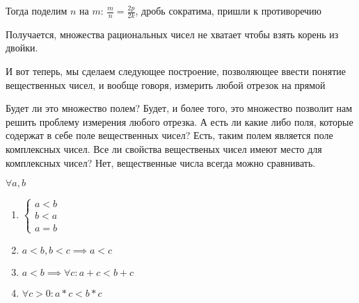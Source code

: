 Тогда поделим \( n \) на \( m \): \( \frac{m}{n} = \frac{2p}{2k} \), дробь сократима, пришли к противоречию

Получается, множества рациональных чисел не хватает чтобы взять корень из двойки.

И вот теперь, мы сделаем следующее построение, позволяющее ввести понятие вещественных чисел, и вообще говоря, измерить любой отрезок на прямой

Будет ли это множество полем? Будет, и более того, это множество позволит нам решить проблему измерения любого отрезка. А есть ли какие либо поля, которые содержат в себе поле вещественных чисел? Есть, таким полем является поле комплексных чисел. Все ли свойства вещественых чисел имеют место для комплексных чисел? Нет, вещественные числа всегда можно сравнивать. 

\newpage

\( \forall a, b \)
\begin{enumerate}
	\item \(
		\begin{cases*}
			a < b \\
			b < a \\
			a = b
		\end{cases*}
	\)
	\item \( a < b, b < c \implies a < c \)
	\item \(a < b \implies \forall c : a + c < b + c \)
	\item \( \forall c > 0 : a * c < b * c \)
\end{enumerate}